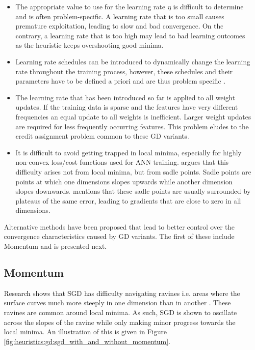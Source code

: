 \begin{itemize}
      \item The appropriate value to use for the learning rate $\eta$ is difficult to determine and is often problem-specific. A learning rate that is too small causes premature exploitation, leading to slow and bad convergence. On the contrary, a learning rate that is too high may lead to bad learning outcomes as the heuristic keeps overshooting good minima.

      \item Learning rate schedules \cite{ref:robbins:1951} can be introduced to dynamically change the learning rate throughout the training process, however, these schedules and their parameters have to be defined a priori and are thus problem specific \cite{ref:darken:1992}.

      \item The learning rate that has been introduced so far is applied to all weight updates. If the training data is sparse and the features have very different frequencies an equal update to all weights is inefficient. Larger weight updates are required for less frequently occurring features. This problem eludes to the credit assignment problem \cite{ref:rumelhart:1986} common to these \ac{GD} variants.

      \item It is difficult to avoid getting trapped in local minima, especially for highly non-convex loss/cost functions used for \ac{ANN} training. \cite{ref:dauphin:2014} argues that this difficulty arises not from local minima, but from sadle points. Sadle points are points at which one dimensions slopes upwards while another dimension slopes downwards. \cite{ref:ruder:2016} mentions that these sadle points are usually surrounded by plateaus of the same error, leading to gradients that are close to zero in all dimensions.
\end{itemize}


Alternative methods have been proposed that lead to better control over the convergence characteristics caused by \ac{GD} variants. The first of these include \ac{Momentum} and is presented next.


\subsection{Momentum}
\label{sec:heuristics:gd:momentum}

Research shows that \ac{SGD} has difficulty navigating ravines i.e. areas where the surface curves much more steeply in one dimension than in another \cite{ref:sutton:1986}. These ravines are common around local minima. As such, \ac{SGD} is shown to oscillate across the slopes of the ravine while only making minor progress towards the local minima. An illustration of this is given in Figure \ref{fig:heuristics:gd:sgd_with_and_without_momentum}.

